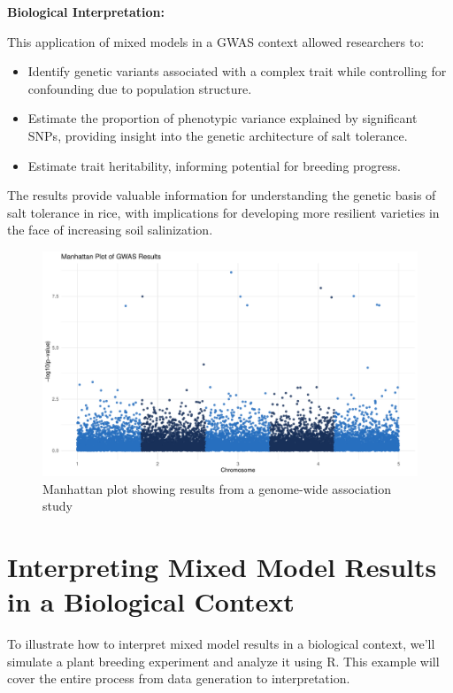 \documentclass[12pt,a4paper]{article}
\newenvironment{interpretation}[1][]
{\begin{basebox}[linecolor=uqgreen]
\textbf{\color{uqgreen}Biological Interpretation:} \textit{#1}\par\noindent\ignorespaces}
{\end{basebox}}
\begin{document}
\begin{interpretation}
This application of mixed models in a GWAS context allowed researchers to:
\begin{itemize}
    \item Identify genetic variants associated with a complex trait while controlling for confounding due to population structure.
    \item Estimate the proportion of phenotypic variance explained by significant SNPs, providing insight into the genetic architecture of salt tolerance.
    \item Estimate trait heritability, informing potential for breeding progress.
\end{itemize}
The results provide valuable information for understanding the genetic basis of salt tolerance in rice, with implications for developing more resilient varieties in the face of increasing soil salinization.
\end{interpretation}

\begin{figure}[htbp]
  \centering
  \includegraphics[width=1\textwidth]{manhattan_plot.pdf}
  \caption{Manhattan plot showing results from a genome-wide association study}
  \label{fig:manhattan_plot}
\end{figure}

\section{Interpreting Mixed Model Results in a Biological Context}

To illustrate how to interpret mixed model results in a biological context, we'll simulate a plant breeding experiment and analyze it using R. This example will cover the entire process from data generation to interpretation.
\end{document}
